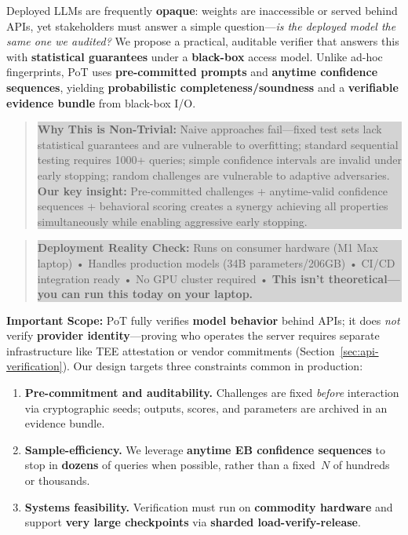 \documentclass[11pt]{article}
\begin{document}
Deployed LLMs are frequently \textbf{opaque}: weights are inaccessible or served behind APIs, yet stakeholders must answer a simple question---\emph{is the deployed model the same one we audited?} We propose a practical, auditable verifier that answers this with \textbf{statistical guarantees} under a \textbf{black-box} access model. Unlike ad-hoc fingerprints, PoT uses \textbf{pre-committed prompts} and \textbf{anytime confidence sequences}, yielding \textbf{probabilistic completeness/soundness} and a \textbf{verifiable evidence bundle} from black-box I/O\@.

\begin{quote}
\colorbox{lightgray}{\parbox{0.95\textwidth}{\textbf{Why This is Non-Trivial:} Naive approaches fail---fixed test sets lack statistical guarantees and are vulnerable to overfitting; standard sequential testing requires 1000+ queries; simple confidence intervals are invalid under early stopping; random challenges are vulnerable to adaptive adversaries. \textbf{Our key insight:} Pre-committed challenges + anytime-valid confidence sequences + behavioral scoring creates a synergy achieving all properties simultaneously while enabling aggressive early stopping.}}
\end{quote}

\begin{quote}
\colorbox{lightgray}{\parbox{0.95\textwidth}{\textbf{Deployment Reality Check:} Runs on consumer hardware (M1 Max laptop) • Handles production models (34B parameters/206GB) • CI/CD integration ready • No GPU cluster required • \textbf{This isn't theoretical---you can run this today on your laptop.}}}
\end{quote}

\textbf{Important Scope:} PoT fully verifies \textbf{model behavior} behind APIs; it does \emph{not} verify \textbf{provider identity}---proving who operates the server requires separate infrastructure like TEE attestation or vendor commitments (Section~\ref{sec:api-verification}). Our design targets three constraints common in production:

\begin{enumerate}
\item \textbf{Pre-commitment and auditability.} Challenges are fixed \emph{before} interaction via cryptographic seeds; outputs, scores, and parameters are archived in an evidence bundle.
\item \textbf{Sample-efficiency.} We leverage \textbf{anytime EB confidence sequences} to stop in \textbf{dozens} of queries when possible, rather than a fixed~$N$ of hundreds or thousands.
\item \textbf{Systems feasibility.} Verification must run on \textbf{commodity hardware} and support \textbf{very large checkpoints} via \textbf{sharded load-verify-release}.
\end{enumerate}
\end{document}
